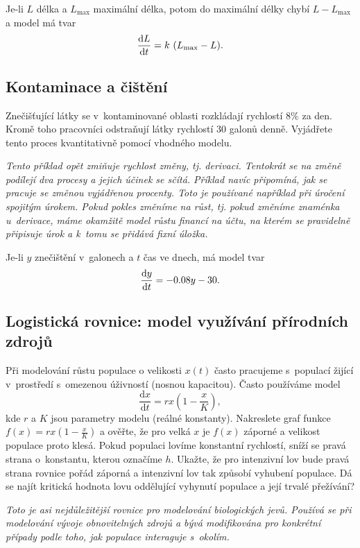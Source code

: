 \reseni
Je-li $L$ délka a $L_{\max}$ maximální délka, potom do maximální délky chybí  $L-L_{\max}$ a model má tvar
$$\derivace Lt=k (L_{\max}-L).$$
\konec

\subsection{Kontaminace a čištění}
Znečišťující látky se v kontaminované oblasti rozkládají rychlostí
$8\%$ za den. Kromě toho pracovníci odstraňují látky rychlostí $30$
galonů denně. Vyjádřete tento proces kvantitativně pomocí vhodného
modelu.

\textit{Tento příklad opět zmiňuje rychlost změny, tj. derivaci. Tentokrát se na změně podílejí dva procesy a jejich účinek se sčítá. Příklad navíc připomíná, jak se pracuje se změnou vyjádřenou procenty. Toto je používané například při úročení spojitým úrokem. Pokud pokles změníme na růst, tj. pokud změníme
  znaménka u derivace, máme okamžitě model růstu financí na účtu, na kterém se pravidelně připisuje úrok a k tomu se přidává fixní úložka.}

\reseni Je-li $y$ znečištění v galonech a $t$ čas ve dnech, má model tvar
$$\frac{\mathrm{d}y}{\mathrm{d}t}=-0.08y-30.$$

\konec



\subsection{Logistická rovnice: model využívání přírodních zdrojů}
Při modelování růstu populace o velikosti $x(t)$ často pracujeme s populací žijící v prostředí s omezenou úživností (nosnou kapacitou). Často používáme model
$$\frac{\mathrm d x}{\mathrm dt}=rx\left(1-\frac xK\right),$$
kde $r$ a $K$ jsou parametry modelu (reálné konstanty).  Nakreslete
graf funkce $f(x)=rx\left(1-\frac xK\right)$ a ověřte, že pro velká
$x$ je $f(x)$ záporné a velikost populace proto klesá. Pokud populaci
lovíme konstantní rychlostí, sníží se pravá strana o konstantu, kterou
označíme $h$. Ukažte, že pro intenzivní lov bude pravá strana rovnice
pořád záporná a intenzivní lov tak způsobí vyhubení populace. Dá se
najít kritická hodnota lovu oddělující vyhynutí populace a její
trvalé přežívání?

\textit{Toto je asi nejdůležitější rovnice pro modelování biologických jevů. Používá se při modelování vývoje obnovitelných zdrojů a bývá modifikována pro konkrétní případy podle toho, jak populace interaguje s okolím.}

